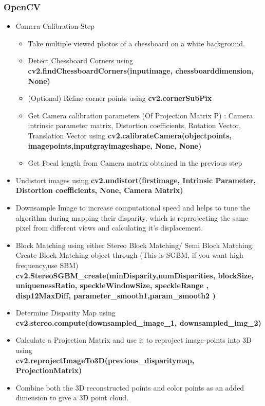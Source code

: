 \documentclass{article}[11pt]
\begin{document}
\subsubsection{OpenCV}
\begin{itemize}
    \item Camera Calibration Step
    \begin{itemize}
        \item Take multiple viewed photos of a chessboard on a white background. 
        \item Detect Chessboard Corners using \textbf{cv2.findChessboardCorners(inputimage, chessboarddimension, None)}
        \item (Optional) Refine corner points using \textbf{cv2.cornerSubPix}
        \item Get Camera calibration parameters (Of Projection Matrix P) : Camera intrinsic parameter matrix, Distortion coefficients, Rotation Vector, Translation Vector using \textbf{cv2.calibrateCamera(objectpoints, imagepoints,inputgrayimageshape, None, None)}
        \item Get Focal length from Camera matrix obtained in the previous step

    \end{itemize}
    \item Undistort images using \textbf{cv2.undistort(firstimage, Intrinsic Parameter, Distortion coefficients, None, Camera Matrix)}
    \item Downsample Image to increase computational speed and helps to tune the algorithm during mapping their disparity, which is reprrojecting the same pixel from different views and calculating it's displacement.
    \item Block Matching using either Stereo Block Matching/ Semi Block Matching: 
    \\ Create Block Matching object through (This is SGBM, if you want high frequency,use SBM) \\\textbf{cv2.StereoSGBM\_create(minDisparity,numDisparities,
 blockSize,
 uniquenessRatio,
 speckleWindowSize,
 speckleRange ,
 disp12MaxDiff, parameter\_smooth1,param\_smooth2 )}
 
    \item Determine Disparity Map using \textbf{cv2.stereo.compute(downsampled\_image\_1, downsampled\_img\_2)}
    \item Calculate a Projection Matrix and use it to reproject image-points into 3D using
    \\ \textbf{cv2.reprojectImageTo3D(previous\_disparitymap, ProjectionMatrix)}
    \item Combine both the 3D reconstructed points and color points as an added dimension to give a 3D point cloud.
    
\end{itemize}
\end{document}
